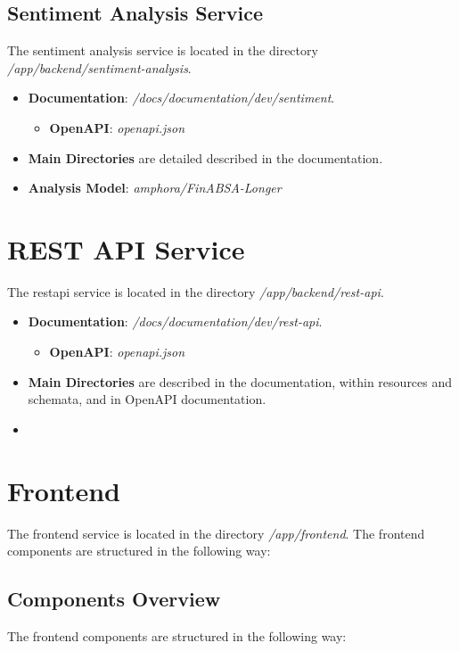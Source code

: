 \subsection{Sentiment Analysis Service}
\label{subsec:development-sentiment}
The sentiment analysis service is located in the directory \textit{/app/backend/}\textit{sentiment-analysis}.

\begin{itemize}
    \item \textbf{Documentation}: \textit{/docs/documentation/dev/sentiment}.
    \begin{itemize}
        \item \textbf{OpenAPI}: \textit{openapi.json}
    \end{itemize}
    \item \textbf{Main Directories} are detailed described in the documentation.
    \item \textbf{Analysis Model}: \textit{amphora/FinABSA-Longer}
\end{itemize}

\section{REST API Service}
\label{sec:development-rest-api}
The \acrshort{restapi} service is located in the directory \textit{/app/backend/rest-api}.

\begin{itemize}
    \item \textbf{Documentation}: \textit{/docs/documentation/dev/rest-api}.
    \begin{itemize}
        \item \textbf{OpenAPI}: \textit{openapi.json}
    \end{itemize}
    \item \textbf{Main Directories} are described in the documentation, within resources and schemata, and in OpenAPI documentation.
    \item \
\end{itemize}

\section{Frontend}
\label{sec:development-frontend}
The frontend service is located in the directory \textit{/app/frontend}. The frontend components are structured in the following way:

\subsection{Components Overview}
\label{subsec:development-components-overview}
The frontend components are structured in the following way:

